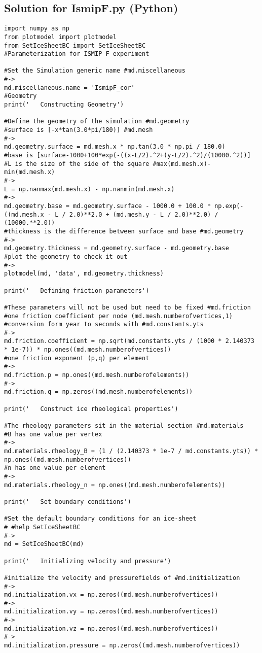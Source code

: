\subsection{Solution for IsmipF.py (Python)}%
\begin{verbatim}import numpy as np
from plotmodel import plotmodel
from SetIceSheetBC import SetIceSheetBC
#Parameterization for ISMIP F experiment

#Set the Simulation generic name #md.miscellaneous
#->
md.miscellaneous.name = 'IsmipF_cor'
#Geometry
print('   Constructing Geometry')

#Define the geometry of the simulation #md.geometry
#surface is [-x*tan(3.0*pi/180)] #md.mesh
#->
md.geometry.surface = md.mesh.x * np.tan(3.0 * np.pi / 180.0)
#base is [surface-1000+100*exp(-((x-L/2).^2+(y-L/2).^2)/(10000.^2))]
#L is the size of the side of the square #max(md.mesh.x)-min(md.mesh.x)
#->
L = np.nanmax(md.mesh.x) - np.nanmin(md.mesh.x)
#->
md.geometry.base = md.geometry.surface - 1000.0 + 100.0 * np.exp(-((md.mesh.x - L / 2.0)**2.0 + (md.mesh.y - L / 2.0)**2.0) / (10000.**2.0))
#thickness is the difference between surface and base #md.geometry
#->
md.geometry.thickness = md.geometry.surface - md.geometry.base
#plot the geometry to check it out
#->
plotmodel(md, 'data', md.geometry.thickness)

print('   Defining friction parameters')

#These parameters will not be used but need to be fixed #md.friction
#one friction coefficient per node (md.mesh.numberofvertices,1)
#conversion form year to seconds with #md.constants.yts
#->
md.friction.coefficient = np.sqrt(md.constants.yts / (1000 * 2.140373 * 1e-7)) * np.ones((md.mesh.numberofvertices))
#one friction exponent (p,q) per element
#->
md.friction.p = np.ones((md.mesh.numberofelements))
#->
md.friction.q = np.zeros((md.mesh.numberofelements))

print('   Construct ice rheological properties')

#The rheology parameters sit in the material section #md.materials
#B has one value per vertex
#->
md.materials.rheology_B = (1 / (2.140373 * 1e-7 / md.constants.yts)) * np.ones((md.mesh.numberofvertices))
#n has one value per element
#->
md.materials.rheology_n = np.ones((md.mesh.numberofelements))

print('   Set boundary conditions')

#Set the default boundary conditions for an ice-sheet
# #help SetIceSheetBC
#->
md = SetIceSheetBC(md)

print('   Initializing velocity and pressure')

#initialize the velocity and pressurefields of #md.initialization
#->
md.initialization.vx = np.zeros((md.mesh.numberofvertices))
#->
md.initialization.vy = np.zeros((md.mesh.numberofvertices))
#->
md.initialization.vz = np.zeros((md.mesh.numberofvertices))
#->
md.initialization.pressure = np.zeros((md.mesh.numberofvertices))\end{verbatim}
